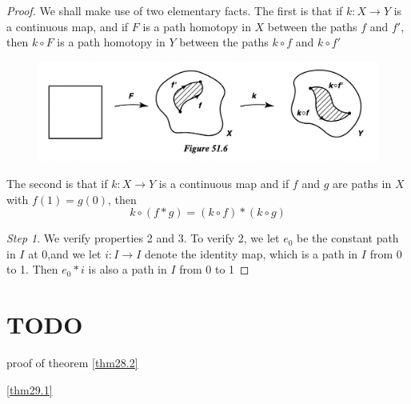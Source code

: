 \documentclass[11pt]{article}
\begin{document}
\begin{proof}
We shall make use of two elementary facts. The first is that if \(k:X\to Y\) is a continuous map,
and if \(F\) is a path homotopy in \(X\) between the paths \(f\) and \(f'\), then \(k\circ F\) is a
path homotopy in \(Y\) between the paths \(k\circ f\) and \(k\circ f'\)
\begin{figure}[htbp]
\centering
\includegraphics[width=.8\textwidth]{../images/Topology/13.png}
\caption{\label{}}
\end{figure}

The second is that if \(k:X\to Y\) is a continuous map and if \(f\) and \(g\) are paths in \(X\)
with \(f(1)=g(0)\), then
\begin{equation*}
k\circ (f*g)=(k\circ f)*(k\circ g)
\end{equation*}

\emph{Step 1}. We verify properties 2 and 3. To verify 2, we let \(e_0\) be the constant path in \(I\)
at 0,and we let \(i:I\to I\) denote the identity map, which is a path in \(I\) from 0 to 1.
Then \(e_0*i\) is also a path in \(I\) from 0 to 1
\end{proof}

\section{TODO}
\label{sec:org39ee06e}
proof of theorem \ref{thm28.2}

\ref{thm29.1}
\end{document}
